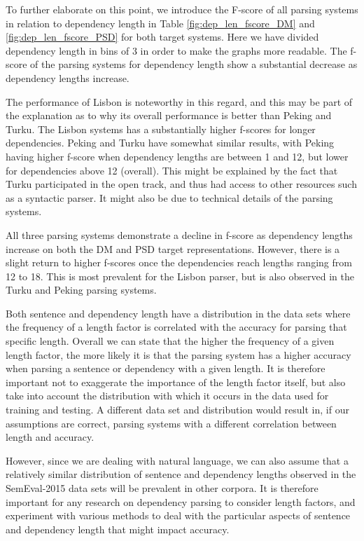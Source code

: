 To further elaborate on this point, we introduce the F-score of all parsing systems in relation to dependency length in Table \ref{fig:dep_len_fscore_DM} and \ref{fig:dep_len_fscore_PSD} for both target systems. Here we have divided dependency length in bins of 3 in order to make the graphs more readable. The f-score of the parsing systems for dependency length show a substantial decrease as dependency lengths increase.

The performance of Lisbon is noteworthy in this regard, and this may be part of the explanation as to why its overall performance is better than Peking and Turku. The Lisbon systems has a substantially higher f-scores for longer dependencies. Peking and Turku have somewhat similar results, with Peking having higher f-score when dependency lengths are between 1 and 12, but lower for dependencies above 12 (overall). This might be explained by the fact that Turku participated in the open track, and thus had access to other resources such as a syntactic parser. It might also be due to technical details of the parsing systems.

All three parsing systems demonstrate a decline in f-score as dependency lengths increase on both the DM and PSD target representations. However, there is a slight return to higher f-scores once the dependencies reach lengths ranging from 12 to 18. This is most prevalent for the Lisbon parser, but is also observed in the Turku and Peking parsing systems.

Both sentence and dependency length have a distribution in the data sets where the frequency of a length factor is correlated with the accuracy for parsing that specific length. Overall we can state that the higher the frequency of a given length factor, the more likely it is that the parsing system has a higher accuracy when parsing a sentence or dependency with a given length. It is therefore important not to exaggerate the importance of the length factor itself, but also take into account the distribution with which it occurs in the data used for training and testing. A different data set and distribution would result in, if our assumptions are correct, parsing systems with a different correlation between length and accuracy.

However, since we are dealing with natural language, we can also assume that a relatively similar distribution of sentence and dependency lengths observed in the SemEval-2015 data sets will be prevalent in other corpora. It is therefore important for any research on dependency parsing to consider length factors, and experiment with various methods to deal with the particular aspects of sentence and dependency length that might impact accuracy.

